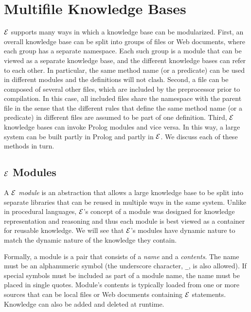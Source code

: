 \documentclass[11pt]{article}
\newcommand{\ERGO}{\mbox{\ensuremath{\cal{E}}\smaller{{\sc{RGO}}}}\xspace}
\newcommand{\FLSYSTEM}{\ERGO}
\begin{document}
\section{Multifile Knowledge Bases}

\FLSYSTEM supports many ways in which a knowledge base can be modularized.
First, an overall knowledge base
can be split into groups of files or Web documents, where each
group has a separate namespace. Each
such group is a module that
can be viewed as a separate knowledge base, and the different
knowledge bases can refer to
each other. In particular, the same method name (or a
predicate) can be used in different modules and the definitions will not
clash.  Second, a file can be composed of several other files, which
are included by the preprocessor prior to compilation. In this
case, all included files share the namespace with the parent file
in the sense that the different
rules that define the same method name (or a predicate) in different files
are assumed to be part of one definition. Third, \FLSYSTEM knowledge bases
can invoke
Prolog modules and vice versa. In this way, a large system can be built partly
in Prolog and partly in \FLSYSTEM.
We discuss each of these methods in turn.


\subsection{\FLSYSTEM Modules} \label{sec:flora-modules}

A \emph{\FLSYSTEM module} is an abstraction that allows a large knowledge
base to be split into separate libraries that can be reused in multiple
ways in the same system.  Unlike in procedural languages, \FLSYSTEM's
concept of a module was designed for knowledge representation and reasoning
and thus each module is best viewed as a container for reusable knowledge.
We will see that \FLSYSTEM's modules have dynamic nature to match the
dynamic nature of the knowledge they contain.

Formally, a module is a pair that consists of a
\emph{name} and a \emph{contents}. The name must be an alphanumeric symbol
(the underscore character, {\tt \_}, is also allowed). If special symbols
must be included as part of a module name, the name must be placed in single
quotes.
Module's contents
is typically loaded from one or more sources that
can be local files or Web documents containing \FLSYSTEM statements. Knowledge can also be added and
deleted at runtime.
\end{document}
